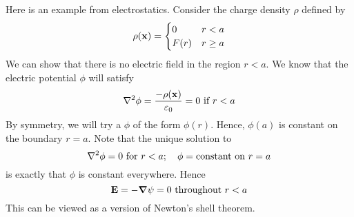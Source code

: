 \documentclass{article}
\begin{document}
\noindent Here is an example from electrostatics. Consider the charge density $\rho$ defined by
\[ \rho(\vb x) = \begin{cases}
        0    & r < a    \\
        F(r) & r \geq a
    \end{cases} \]
We can show that there is no electric field in the region $r < a$. We know that the electric potential $\phi$ will satisfy
\[ \laplacian{\phi} = \frac{-\rho(\vb x)}{\varepsilon_0} = 0 \text{ if } r<a \]
By symmetry, we will try a $\phi$ of the form $\phi(r)$. Hence, $\phi(a)$ is constant on the boundary $r=a$. Note that the unique solution to
\[ \laplacian{\phi} = 0 \text{ for } r<a;\quad \phi = \text{constant on } r = a \]
is exactly that $\phi$ is constant everywhere. Hence
\[ \vb E = -\grad{\psi} = 0 \text{ throughout } r<a \]
This can be viewed as a version of Newton's shell theorem.
\end{document}
